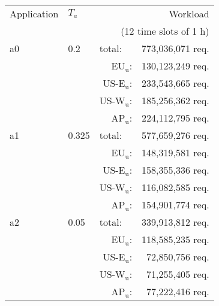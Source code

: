 \begin{tabular}{llrr}
\toprule
Application & $T_a$ & \multicolumn{2}{r}{Workload} \\
\multicolumn{4}{r}{(12 time slots of 1 h)} \\
\midrule
a0 & 0.2 & \multicolumn{1}{l}{total:} & 773,036,071 req.\\
 &  &   \hspace{0.4cm}$\text{EU}_\text{u}$: & 130,123,249 req.\\
 &  &   \hspace{0.4cm}$\text{US-E}_\text{u}$: & 233,543,665 req.\\
 &  &   \hspace{0.4cm}$\text{US-W}_\text{u}$: & 185,256,362 req.\\
 &  &   \hspace{0.4cm}$\text{AP}_\text{u}$: & 224,112,795 req.\\
a1 & 0.325 & \multicolumn{1}{l}{total:} & 577,659,276 req.\\
 &  &   \hspace{0.4cm}$\text{EU}_\text{u}$: & 148,319,581 req.\\
 &  &   \hspace{0.4cm}$\text{US-E}_\text{u}$: & 158,355,336 req.\\
 &  &   \hspace{0.4cm}$\text{US-W}_\text{u}$: & 116,082,585 req.\\
 &  &   \hspace{0.4cm}$\text{AP}_\text{u}$: & 154,901,774 req.\\
a2 & 0.05 & \multicolumn{1}{l}{total:} & 339,913,812 req.\\
 &  &   \hspace{0.4cm}$\text{EU}_\text{u}$: & 118,585,235 req.\\
 &  &   \hspace{0.4cm}$\text{US-E}_\text{u}$: & 72,850,756 req.\\
 &  &   \hspace{0.4cm}$\text{US-W}_\text{u}$: & 71,255,405 req.\\
 &  &   \hspace{0.4cm}$\text{AP}_\text{u}$: & 77,222,416 req.\\
\bottomrule
\end{tabular}


